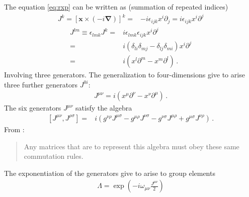 The equation \eqref{eq:rxp} can be written as (summation of repeated indices)
\begin{align}
  J^k=\left[\mathbf{x}\times (-i\boldsymbol{\nabla})\right]^k=&
-i\epsilon_{ijk}x^i\partial_j=i\epsilon_{ijk}x^i\partial^j
\end{align}
\begin{align}
  J^{l m}\equiv\epsilon_{lmk}J^k=&i\epsilon_{lmk}\epsilon_{ijk}x^i\partial^j\nonumber\\
=&i(\delta_{li}\delta_{mj}-\delta_{lj}\delta_{mi})x^i\partial^j\nonumber\\
=&i(x^l\partial^m-x^m\partial^l)\,.
\end{align}
Involving three generators. The generalization to four-dimensions give to arise three further generators $J^{0i}$:
\begin{align}
  J^{\mu\nu}=i(x^\mu\partial^\nu-x^\nu\partial^\mu)\,.
\end{align}
The six generators $J^{\mu\nu}$ satisfy the algebra
\begin{align}
\label{eq:lrtalg}
  \left[J^{\mu\nu},J^{\rho\sigma}\right]=&
i(g^{\nu\rho}J^{\mu\sigma}-g^{\mu\rho}J^{\nu\sigma}-g^{\nu\sigma}J^{\mu\rho}+g^{\mu\sigma}J^{\nu\rho})\,.
\end{align}
From \cite{Peskin}:
\begin{quote}
  Any matrices that are to represent this algebra must obey these same commutation rules. 
\end{quote}

The exponentiation of the generators give to arise to group elements
\begin{align}
  \Lambda=\exp\left(-i\omega_{\mu\nu}\frac{J^{\mu\nu}}{2}\right)
\end{align}



